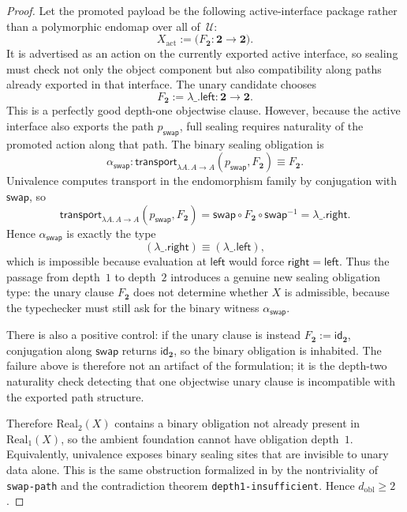 \documentclass{lmcs}
\newcommand{\U}{\mathcal{U}}
\newcommand{\Real}{\mathrm{Real}}
\begin{document}
\begin{proof}
Let the promoted payload be the following active-interface package rather than a polymorphic endomap over all of~$\U$:
\[
  X_{\mathrm{act}}
  :=
  \bigl(F_{\mathbf{2}}:\mathbf{2}\to\mathbf{2}\bigr).
\]
It is advertised as an action on the currently exported active interface, so sealing must check not only the object component but also compatibility along paths already exported in that interface. The unary candidate chooses
\[
  F_{\mathbf{2}} := \lambda\_ . \mathsf{left} : \mathbf{2} \to \mathbf{2}.
\]
This is a perfectly good depth-one objectwise clause. However, because the active interface also exports the path $p_{\mathsf{swap}}$, full sealing requires naturality of the promoted action along that path. The binary sealing obligation is
\[
  \alpha_{\mathsf{swap}}
  :
  \mathsf{transport}_{\lambda A.\, A \to A}(p_{\mathsf{swap}}, F_{\mathbf{2}})
  \equiv
  F_{\mathbf{2}}.
\]
Univalence computes transport in the endomorphism family by conjugation with $\mathsf{swap}$, so
\[
  \mathsf{transport}_{\lambda A.\, A \to A}(p_{\mathsf{swap}}, F_{\mathbf{2}})
  =
  \mathsf{swap} \circ F_{\mathbf{2}} \circ \mathsf{swap}^{-1}
  =
  \lambda\_ . \mathsf{right}.
\]
Hence $\alpha_{\mathsf{swap}}$ is exactly the type
\[
  (\lambda\_ . \mathsf{right}) \equiv (\lambda\_ . \mathsf{left}),
\]
which is impossible because evaluation at $\mathsf{left}$ would force $\mathsf{right} = \mathsf{left}$. Thus the passage from depth~$1$ to depth~$2$ introduces a genuine new sealing obligation type: the unary clause $F_{\mathbf{2}}$ does not determine whether $X$ is admissible, because the typechecker must still ask for the binary witness $\alpha_{\mathsf{swap}}$.

There is also a positive control: if the unary clause is instead $F_{\mathbf{2}}:=\mathsf{id}_{\mathbf{2}}$, conjugation along $\mathsf{swap}$ returns $\mathsf{id}_{\mathbf{2}}$, so the binary obligation is inhabited. The failure above is therefore not an artifact of the formulation; it is the depth-two naturality check detecting that one objectwise unary clause is incompatible with the exported path structure.

Therefore $\Real_2(X)$ contains a binary obligation not already present in $\Real_1(X)$, so the ambient foundation cannot have obligation depth~$1$. Equivalently, univalence exposes binary sealing sites that are invisible to unary data alone. This is the same obstruction formalized in  by the nontriviality of \texttt{swap-path} and the contradiction theorem \texttt{depth1-insufficient}. Hence $d_{\mathrm{obl}} \geq 2$.
\end{proof}
\end{document}
